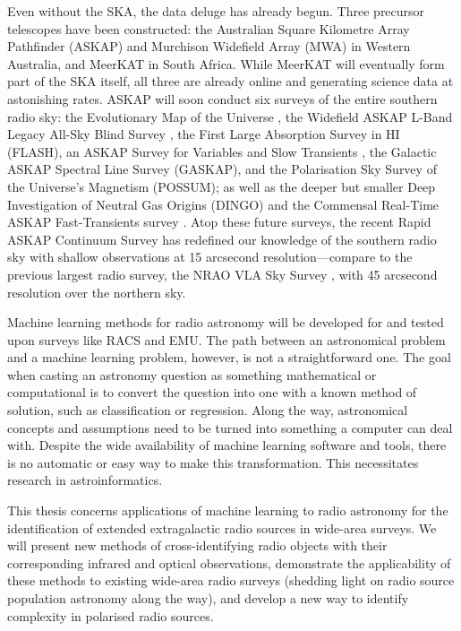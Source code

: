 Even without the SKA, the data deluge has already begun. Three precursor telescopes have been constructed: the Australian Square Kilometre Array Pathfinder \linebreak(ASKAP) and Murchison Widefield Array (MWA) in Western Australia, and MeerKAT in South Africa. While MeerKAT will eventually form part of the SKA itself, all three are already online and generating science data at astonishing rates. ASKAP will soon conduct six surveys of the entire southern radio sky: the Evolutionary Map of the Universe \citep[EMU;][]{norris11,kapinska_emu_2020}, the Widefield ASKAP L-Band Legacy All-Sky Blind Survey \citep[WALLABY]{koribalski_wallaby_2020}, the First Large Absorption Survey in HI (FLASH), an ASKAP Survey for Variables and Slow Transients \citep[VAST;][]{murphy_vast_2013}, the Galactic ASKAP Spectral Line Survey (GASKAP), and the Polarisation Sky Survey of the Universe's Magnetism (POSSUM); as well as the deeper but smaller Deep Investigation of Neutral Gas Origins (DINGO) and the Commensal Real-Time ASKAP Fast-Transients survey \citep[CRAFT;][]{macquart10craft}. Atop these future surveys, the recent Rapid ASKAP Continuum Survey \citep[RACS;][]{mcconnell_rapid_2020} has redefined our knowledge of the southern radio sky with shallow observations at 15 arcsecond resolution---compare to the previous largest radio survey, the NRAO VLA Sky Survey \citep[NVSS;][]{condon98nvss}, with 45 arcsecond resolution over the northern sky.

Machine learning methods for radio astronomy will be developed for and tested upon surveys like RACS and EMU. The path between an astronomical problem and a machine learning problem, however, is not a straightforward one. The goal when casting an astronomy question as something mathematical or computational is to convert the question into one with a known method of solution, such as classification or regression. Along the way, astronomical concepts and assumptions need to be turned into something a computer can deal with. Despite the wide availability of machine learning software and tools, there is no automatic or easy way to make this transformation. This necessitates research in astroinformatics.

This thesis concerns applications of machine learning to radio astronomy for the identification of extended extragalactic radio sources in wide-area surveys. We will present new methods of cross-identifying radio objects with their corresponding infrared and optical observations, demonstrate the applicability of these methods to existing wide-area radio surveys (shedding light on radio source population astronomy along the way), and develop a new way to identify complexity in polarised radio sources.


